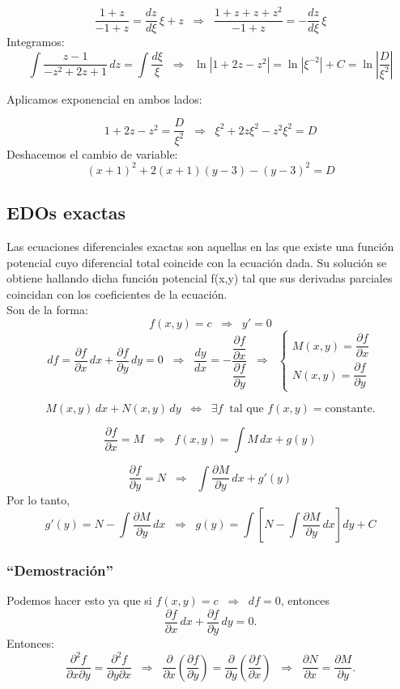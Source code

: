 \documentclass[a4paper,12pt]{article}
\begin{document}
\[
\frac{1+z}{-1+z} = \frac{dz}{d\xi}\,\xi + z
\;\;\Rightarrow\;\;
\frac{1+z+z+z^2}{-1+z} = -\frac{dz}{d\xi}\,\xi
\]
Integramos:
\[
\int \frac{z-1}{-z^2+2z+1}\,dz = \int \frac{d\xi}{\xi}
\;\;\Rightarrow\;\;
\ln|1+2z-z^2| = \ln|\xi^{-2}| + C = \ln\left|\frac{D}{\xi^2}\right|
\]

\medskip
\noindent
Aplicamos exponencial en ambos lados:

\[
1+2z-z^2 = \frac{D}{\xi^2}
\;\;\Rightarrow\;\;
\xi^2 + 2z\xi^2 - z^2\xi^2 = D
\]
Deshacemos el cambio de variable:
\[
(x+1)^2 + 2(x+1)(y-3) - (y-3)^2 = D
\]

\newpage
\noindent
\subsection{EDOs exactas}
\noindent
Las ecuaciones diferenciales exactas son aquellas en las que existe una función 
potencial cuyo diferencial total coincide con la ecuación dada. Su solución se 
obtiene hallando dicha función potencial f(x,y) tal que sus derivadas parciales 
coincidan con los coeficientes de la ecuación.\\
Son de la forma:
\[
f(x,y)=c \;\;\Rightarrow\;\; y'=0
\]
\medskip
\[
df = \frac{\partial f}{\partial x}\,dx + \frac{\partial f}{\partial y}\,dy = 0
\;\;\Rightarrow\;\;
\frac{dy}{dx} = -\frac{\dfrac{\partial f}{\partial x}}{\dfrac{\partial f}{\partial y}}
\;\;\Rightarrow\;\;
\begin{cases}
M(x,y) = \dfrac{\partial f}{\partial x} \\[6pt]
N(x,y) = \dfrac{\partial f}{\partial y}
\end{cases}
\]

\[
M(x,y)\,dx + 
N(x,y)\,dy
\;\;\Leftrightarrow\;\; 
\exists f \;\; \text{tal que } f(x,y)=\text{constante}.
\]

\[
\frac{\partial f}{\partial x}=M \;\;\Rightarrow\;\; 
f(x,y) = \int M\,dx + g(y)
\]

\[
\frac{\partial f}{\partial y}=N \;\;\Rightarrow\;\;
\int \frac{\partial M}{\partial y}\,dx + g'(y)
\]
Por lo tanto,
\[
g'(y) = N - \int \frac{\partial M}{\partial y}\,dx 
\;\;\Rightarrow\;\;
g(y) = \int\left[N - \int \frac{\partial M}{\partial y}\,dx\right]dy + C
\]

\subsubsection*{“Demostración”}
\noindent
Podemos hacer esto ya que si $f(x,y)=c \;\;\Rightarrow\;\; df=0$,  
entonces
\[
\frac{\partial f}{\partial x}\,dx + \frac{\partial f}{\partial y}\,dy = 0.
\]
Entonces:
\[
\frac{\partial^2 f}{\partial x \partial y} = \frac{\partial^2 f}{\partial y \partial x}
\;\;\Rightarrow\;\;
\frac{\partial}{\partial x}\!\left(\frac{\partial f}{\partial y}\right)
= \frac{\partial}{\partial y}\!\left(\frac{\partial f}{\partial x}\right)
\;\;\Rightarrow\;\;
\frac{\partial N}{\partial x} = \frac{\partial M}{\partial y}.
\]
\end{document}

